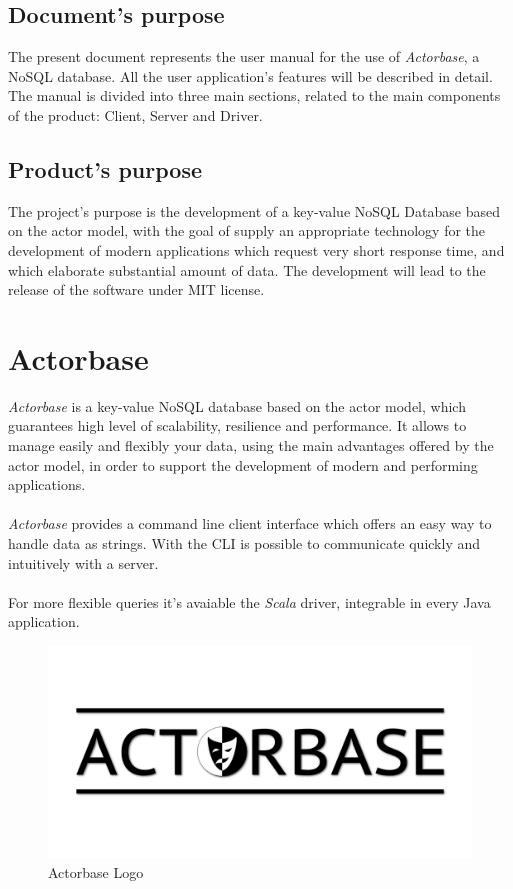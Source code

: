 \documentclass[a4paper]{article}
\begin{document}
	\subsection{Document's purpose}
		The present document represents the user manual for the use of \emph{Actorbase}, a NoSQL database. All the user application's features will be described in detail. The manual is divided into three main sections, related to the main components of the product: Client, Server and Driver.
	\subsection{Product's purpose}
		The project's purpose is the development of a key-value NoSQL Database based on the actor model, with the goal of supply an appropriate technology for the development of modern applications which request very short response time, and which elaborate substantial amount of data. The development will lead to the release of the software under MIT license.	

	\section{Actorbase}
	\emph{Actorbase} is a key-value NoSQL database based on the actor model, which guarantees high level of scalability, resilience and performance. It allows to manage easily and flexibly your data, using the main advantages offered by the actor model, in order to support the development of modern and performing applications.
	\\ \\
	\emph{Actorbase} provides a command line client interface which offers an easy way to handle data as strings. With the CLI is possible to communicate quickly and intuitively with a server.
	\\ \\
	For more flexible queries it's avaiable the \emph{Scala} driver, integrable in every Java application.
	\begin{figure}[H]
		\centering
		\includegraphics[scale=0.4]{actorbaseLogo.png}
		\caption{Actorbase Logo}
	\end{figure}
\end{document}
